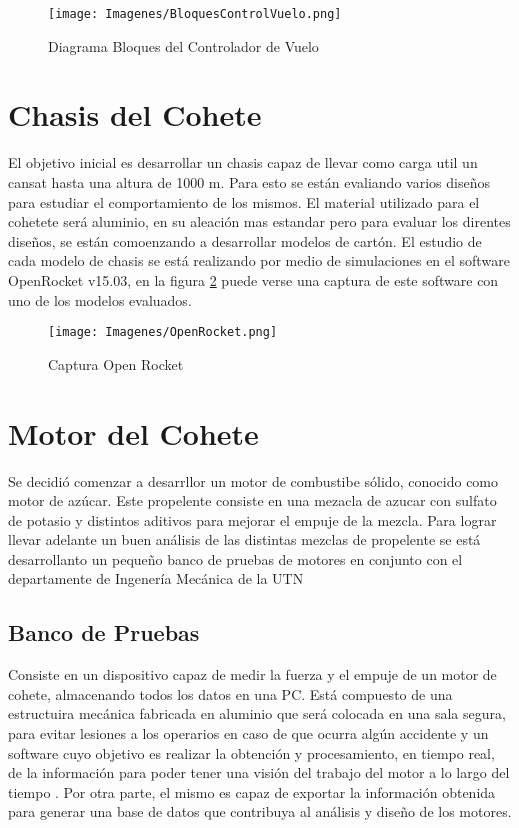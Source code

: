 \documentclass[a4paper]{article} %
\begin{document}
\begin{figure}[!h]
  \centering
    \texttt{[image: Imagenes/BloquesControlVuelo.png]}
  \caption{Diagrama Bloques del Controlador de Vuelo}
  \label{fig:BloquesControlador}
\end{figure}

\section{Chasis del Cohete}
El objetivo inicial es desarrollar un chasis capaz de llevar como carga util un cansat hasta una altura de 1000 m. Para esto se están evaliando varios diseños para estudiar el comportamiento de los mismos. El material utilizado para el cohetete será aluminio, en su aleación mas estandar pero para evaluar los direntes diseños, se están comoenzando a desarrollar modelos de cartón.
El estudio de cada modelo de chasis se está realizando por medio de simulaciones en el software OpenRocket v15.03, en la figura \ref{fig:OpenRocket} puede verse una captura de este software con uno de los modelos evaluados.

\begin{figure}[!h]
  \centering
    \texttt{[image: Imagenes/OpenRocket.png]}
  \caption{Captura Open Rocket}
  \label{fig:OpenRocket}
\end{figure}
\section{Motor del Cohete}
Se decidió comenzar a desarrllor un motor de combustibe sólido, conocido como motor de azúcar. Este propelente consiste en una mezacla de azucar con sulfato de potasio y distintos aditivos para mejorar el empuje de la mezcla. Para lograr llevar adelante un buen análisis de las distintas mezclas de propelente se está desarrollanto un pequeño banco de pruebas de motores en conjunto con el departamente de Ingenería Mecánica de la UTN

\subsection{Banco de Pruebas}
Consiste en un dispositivo capaz de medir la fuerza y el empuje de un motor de cohete, almacenando todos los datos en una PC. Está compuesto de una estructuira mecánica fabricada en aluminio que será colocada en una sala segura, para evitar lesiones a los operarios en caso de que ocurra algún accidente y un software cuyo objetivo es realizar la obtención y procesamiento, en tiempo real, de la información para poder tener una visión del trabajo del motor a lo largo del tiempo . Por otra parte, el mismo es capaz de exportar la información obtenida para generar una base de datos que contribuya al análisis y diseño de los motores.
\end{document}
